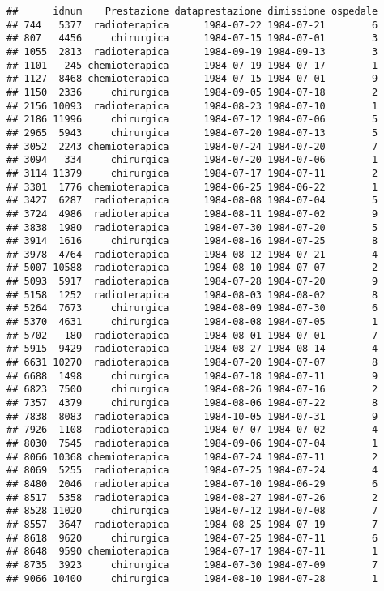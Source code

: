 \documentclass[]{article}
\begin{document}
\begin{verbatim}
##      idnum    Prestazione dataprestazione dimissione ospedale
## 744   5377  radioterapica      1984-07-22 1984-07-21        6
## 807   4456     chirurgica      1984-07-15 1984-07-01        3
## 1055  2813  radioterapica      1984-09-19 1984-09-13        3
## 1101   245 chemioterapica      1984-07-19 1984-07-17        1
## 1127  8468 chemioterapica      1984-07-15 1984-07-01        9
## 1150  2336     chirurgica      1984-09-05 1984-07-18        2
## 2156 10093  radioterapica      1984-08-23 1984-07-10        1
## 2186 11996     chirurgica      1984-07-12 1984-07-06        5
## 2965  5943     chirurgica      1984-07-20 1984-07-13        5
## 3052  2243 chemioterapica      1984-07-24 1984-07-20        7
## 3094   334     chirurgica      1984-07-20 1984-07-06        1
## 3114 11379     chirurgica      1984-07-17 1984-07-11        2
## 3301  1776 chemioterapica      1984-06-25 1984-06-22        1
## 3427  6287  radioterapica      1984-08-08 1984-07-04        5
## 3724  4986  radioterapica      1984-08-11 1984-07-02        9
## 3838  1980  radioterapica      1984-07-30 1984-07-20        5
## 3914  1616     chirurgica      1984-08-16 1984-07-25        8
## 3978  4764  radioterapica      1984-08-12 1984-07-21        4
## 5007 10588  radioterapica      1984-08-10 1984-07-07        2
## 5093  5917  radioterapica      1984-07-28 1984-07-20        9
## 5158  1252  radioterapica      1984-08-03 1984-08-02        8
## 5264  7673     chirurgica      1984-08-09 1984-07-30        6
## 5370  4631     chirurgica      1984-08-08 1984-07-05        1
## 5702   180  radioterapica      1984-08-01 1984-07-01        7
## 5915  9429  radioterapica      1984-08-27 1984-08-14        4
## 6631 10270  radioterapica      1984-07-20 1984-07-07        8
## 6688  1498     chirurgica      1984-07-18 1984-07-11        9
## 6823  7500     chirurgica      1984-08-26 1984-07-16        2
## 7357  4379     chirurgica      1984-08-06 1984-07-22        8
## 7838  8083  radioterapica      1984-10-05 1984-07-31        9
## 7926  1108  radioterapica      1984-07-07 1984-07-02        4
## 8030  7545  radioterapica      1984-09-06 1984-07-04        1
## 8066 10368 chemioterapica      1984-07-24 1984-07-11        2
## 8069  5255  radioterapica      1984-07-25 1984-07-24        4
## 8480  2046  radioterapica      1984-07-10 1984-06-29        6
## 8517  5358  radioterapica      1984-08-27 1984-07-26        2
## 8528 11020     chirurgica      1984-07-12 1984-07-08        7
## 8557  3647  radioterapica      1984-08-25 1984-07-19        7
## 8618  9620     chirurgica      1984-07-25 1984-07-11        6
## 8648  9590 chemioterapica      1984-07-17 1984-07-11        1
## 8735  3923     chirurgica      1984-07-30 1984-07-09        7
## 9066 10400     chirurgica      1984-08-10 1984-07-28        1
\end{verbatim}
\end{document}
